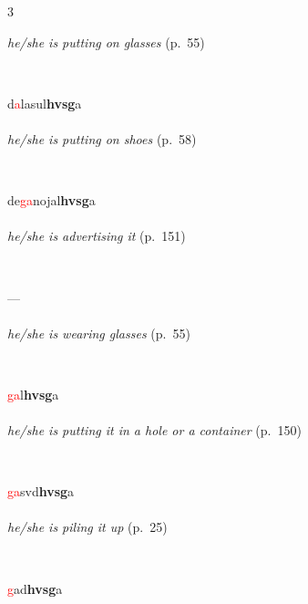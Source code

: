 \documentclass[oneside,openany]{book}%
\begin{document}
\begin{multicols}{3}
\begin{minipage}[t]{\linewidth}
\noindent \textit{he/she is putting on glasses} (p.~55)
\end{minipage}\\[1em]%
\begin{minipage}[t]{\linewidth}
\raggedright\noindent d\textcolor{Red}{a}lasul\textbf{hvsg}a\\
\\
\noindent \textit{he/she is putting on shoes} (p.~58)
\end{minipage}\\[1em]%
\begin{minipage}[t]{\linewidth}
\raggedright\noindent de\textcolor{Red}{ga}nojal\textbf{hvsg}a\\
\\
\noindent \textit{he/she is advertising it} (p.~151)
\end{minipage}\\[1em]%
\begin{minipage}[t]{\linewidth}
\raggedright\noindent ---\\
\\
\noindent \textit{he/she is wearing glasses} (p.~55)
\end{minipage}\\[1em]%
\begin{minipage}[t]{\linewidth}
\raggedright\noindent \textcolor{Red}{ga}l\textbf{hvsg}a\\
\\
\noindent \textit{he/she is putting it in a hole or a container} (p.~150)
\end{minipage}\\[1em]%
\begin{minipage}[t]{\linewidth}
\raggedright\noindent \textcolor{Red}{ga}svd\textbf{hvsg}a\\
\\
\noindent \textit{he/she is piling it up} (p.~25)
\end{minipage}\\[1em]%
\begin{minipage}[t]{\linewidth}
\raggedright\noindent \textcolor{Red}{g}ad\textbf{hvsg}a\\

\end{minipage}
\end{multicols}
\end{document}
